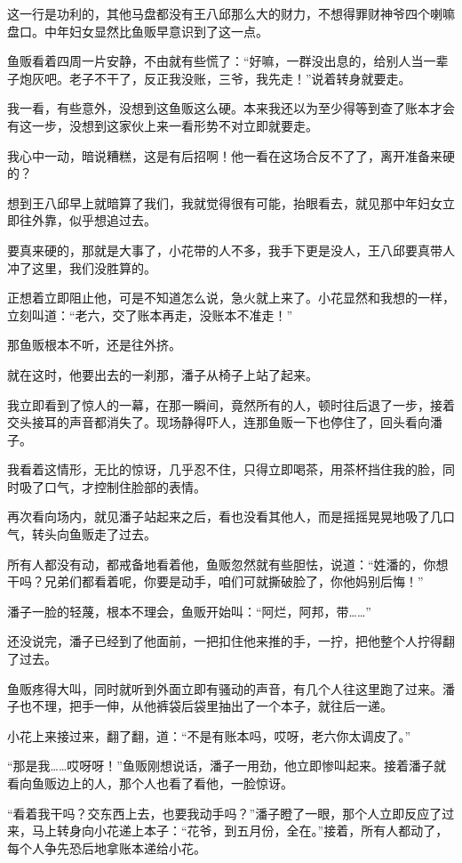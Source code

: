 这一行是功利的，其他马盘都没有王八邱那么大的财力，不想得罪财神爷四个喇嘛盘口。中年妇女显然比鱼贩早意识到了这一点。

鱼贩看着四周一片安静，不由就有些慌了：“好嘛，一群没出息的，给别人当一辈子炮灰吧。老子不干了，反正我没账，三爷，我先走！”说着转身就要走。

我一看，有些意外，没想到这鱼贩这么硬。本来我还以为至少得等到查了账本才会有这一步，没想到这家伙上来一看形势不对立即就要走。

我心中一动，暗说糟糕，这是有后招啊！他一看在这场合反不了了，离开准备来硬的？

想到王八邱早上就暗算了我们，我就觉得很有可能，抬眼看去，就见那中年妇女立即往外靠，似乎想追过去。

要真来硬的，那就是大事了，小花带的人不多，我手下更是没人，王八邱要真带人冲了这里，我们没胜算的。

正想着立即阻止他，可是不知道怎么说，急火就上来了。小花显然和我想的一样，立刻叫道：“老六，交了账本再走，没账本不准走！”

那鱼贩根本不听，还是往外挤。

就在这时，他要出去的一刹那，潘子从椅子上站了起来。

我立即看到了惊人的一幕，在那一瞬间，竟然所有的人，顿时往后退了一步，接着交头接耳的声音都消失了。现场静得吓人，连那鱼贩一下也停住了，回头看向潘子。

我看着这情形，无比的惊讶，几乎忍不住，只得立即喝茶，用茶杯挡住我的脸，同时吸了口气，才控制住脸部的表情。

再次看向场内，就见潘子站起来之后，看也没看其他人，而是摇摇晃晃地吸了几口气，转头向鱼贩走了过去。

所有人都没有动，都戒备地看着他，鱼贩忽然就有些胆怯，说道：“姓潘的，你想干吗？兄弟们都看着呢，你要是动手，咱们可就撕破脸了，你他妈别后悔！”

潘子一脸的轻蔑，根本不理会，鱼贩开始叫：“阿烂，阿邦，带……”

还没说完，潘子已经到了他面前，一把扣住他来推的手，一拧，把他整个人拧得翻了过去。

鱼贩疼得大叫，同时就听到外面立即有骚动的声音，有几个人往这里跑了过来。潘子也不理，把手一伸，从他裤袋后袋里抽出了一个本子，就往后一递。

小花上来接过来，翻了翻，道：“不是有账本吗，哎呀，老六你太调皮了。”

“那是我……哎呀呀！”鱼贩刚想说话，潘子一用劲，他立即惨叫起来。接着潘子就看向鱼贩边上的人，那个人也看了看他，一脸惊讶。

“看着我干吗？交东西上去，也要我动手吗？”潘子瞪了一眼，那个人立即反应了过来，马上转身向小花递上本子：“花爷，到五月份，全在。”接着，所有人都动了，每个人争先恐后地拿账本递给小花。

